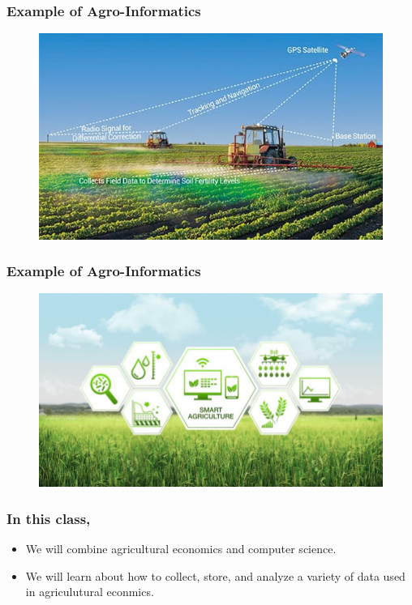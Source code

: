 \documentclass[
	11pt, %
]{beamer}
\begin{document}
\begin{frame}
	\frametitle{Example of Agro-Informatics}
	\begin{figure}
		\includegraphics[width=0.8\linewidth]{images/figure2.png}
		\label{fig:https://www.vervetronics.com/solutions/iot-smart-agriculture/precision-agriculture/}
	\end{figure}
\end{frame}

\begin{frame}
	\frametitle{Example of Agro-Informatics}
	\begin{figure}
		\includegraphics[width=0.8\linewidth]{images/figure3.jpg}
		\label{fig:https://www.linkedin.com/pulse/smart-farming-data-science-sanket-dayama}
	\end{figure}
\end{frame}

\begin{frame}
	\frametitle{In this class,}
		\begin{itemize}
			\item We will combine agricultural economics and computer science.
			\item We will learn about how to collect, store, and analyze a variety of data used in agriculutural econmics.
		\end{itemize}
\end{frame}
\end{document}
